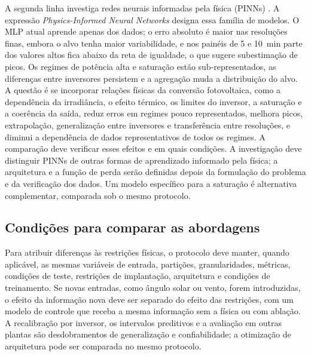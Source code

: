 A segunda linha investiga redes neurais informadas pela física (PINNs)
\cite{raissi2019}. A expressão \textit{Physics-Informed Neural Networks} designa
essa família de modelos. O MLP atual aprende apenas dos dados; o erro absoluto é
maior nas resoluções finas, embora o
alvo tenha maior variabilidade, e nos painéis de 5 e 10~min parte dos valores
altos fica abaixo da reta de igualdade, o que sugere subestimação de picos. Os
regimes de potência alta e saturação estão sub-representados, as diferenças entre
inversores persistem e a agregação muda a distribuição do alvo. A questão é se
incorporar relações físicas da conversão fotovoltaica, como a dependência da
irradiância, o efeito térmico, os limites do inversor, a saturação e a coerência
da saída, reduz erros em regimes pouco representados, melhora picos,
extrapolação, generalização entre inversores e transferência entre resoluções, e
diminui a dependência de dados representativos de todos os regimes. A comparação
deve verificar esses efeitos e em quais condições. A investigação deve distinguir
PINNs de outras formas de aprendizado informado pela física; a arquitetura e a
função de perda serão definidas depois da formulação do problema e da verificação
dos dados. Um modelo específico para a saturação é alternativa complementar,
comparada sob o mesmo protocolo.

\subsection{Condições para comparar as abordagens}
\label{sec:futuro-comparacao}

Para atribuir diferenças às restrições físicas, o protocolo deve manter, quando
aplicável, as mesmas variáveis de entrada, partições, granularidades, métricas,
condições de teste, restrições de implantação, arquitetura e condições de
treinamento. Se novas entradas, como ângulo solar ou vento, forem introduzidas, o
efeito da informação nova deve ser separado do efeito das restrições, com um
modelo de controle que receba a mesma informação sem a física ou com ablação. A
recalibração por inversor, os intervalos preditivos e a avaliação em outras
plantas são desdobramentos de generalização e confiabilidade; a otimização de
arquitetura pode ser comparada no mesmo protocolo.

